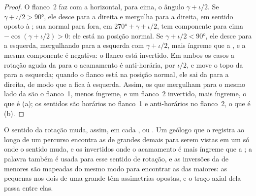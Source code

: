 \begin{proof}
O flanco~2 faz com a horizontal, para cima, o ângulo $\gamma + \iota/2$. Se $\gamma + \iota/2 > \ang{90}$, ele desce para a direita e mergulha para a direita, em sentido oposto à ; sua normal para fora, em $\ang{270} + \gamma +
\iota/2$, tem componente para cima $-\cos(\gamma + \iota/2) > 0$: ele está na posição normal. Se $\gamma + \iota/2 < \ang{90}$, ele desce para a esquerda,
mergulhando para a esquerda com $\gamma + \iota/2$, mais íngreme que a , e a mesma componente é negativa: o flanco está invertido. Em ambos os casos a rotação aguda da  para o acamamento é anti-horária, por $\iota/2$, e move o topo da  para a esquerda; quando o flanco está na posição normal, ele sai da  para a direita, de modo que a  fica à esquerda. Assim, os  que mergulham para o mesmo lado da  são o flanco~1, menos íngreme, e um flanco~2 invertido, mais íngreme, o que é (a); os sentidos são horários no flanco~1 e anti-horários no flanco~2, o que é (b).
\end{proof}

O sentido da rotação muda, assim, em cada ,  ou . Um geólogo que o registra ao longo de um percurso encontra as  de  grandes demais para serem vistas em um só  onde o sentido muda, e os  invertidos onde o acamamento é mais íngreme que a ; a palavra  também é usada para esse sentido de rotação, e as inversões da  de  menores são mapeadas do mesmo modo para encontrar as  das  maiores: as pequenas  nos dois  de uma grande têm assimetrias opostas, e o traço axial dela passa entre elas.

